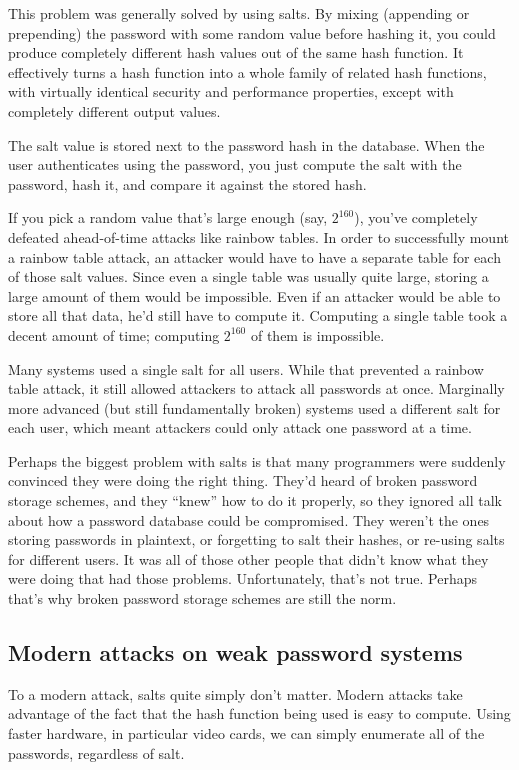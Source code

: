 \documentclass[11pt,ebook,table,dvipsnames]{memoir}
\begin{document}
This problem was generally solved by using \glspl{salt}. By mixing
(appending or prepending) the password with some random value before
hashing it, you could produce completely different hash values out of
the same hash function. It effectively turns a hash function into a
whole family of related hash functions, with virtually identical
security and performance properties, except with completely different
output values.

The salt value is stored next to the password hash in the database.
When the user authenticates using the password, you just compute the
salt with the password, hash it, and compare it against the stored
hash.

If you pick a random value that's large enough (say, $2^{160}$),
you've completely defeated ahead-of-time attacks like rainbow tables.
In order to successfully mount a rainbow table attack, an attacker
would have to have a separate table for each of those salt values.
Since even a single table was usually quite large, storing a large
amount of them would be impossible. Even if an attacker would be able
to store all that data, he'd still have to compute it. Computing a
single table took a decent amount of time; computing $2^{160}$ of them
is impossible.

Many systems used a single salt for all users. While that prevented a
rainbow table attack, it still allowed attackers to attack all
passwords at once. Marginally more advanced (but still fundamentally
broken) systems used a different salt for each user, which meant
attackers could only attack one password at a time.

Perhaps the biggest problem with salts is that many programmers were
suddenly convinced they were doing the right thing. They'd heard of
broken password storage schemes, and they \enquote{knew} how to do it
properly, so they ignored all talk about how a password database could
be compromised. They weren't the ones storing passwords in plaintext,
or forgetting to salt their hashes, or re-using salts for different
users. It was all of those other people that didn't know what they
were doing that had those problems. Unfortunately, that's not true.
Perhaps that's why broken password storage schemes are still the norm.
\subsection{Modern attacks on weak password systems}
\label{sec-2-6-7-4}

To a modern attack, salts quite simply don't matter. Modern attacks
take advantage of the fact that the hash function being used is easy
to compute. Using faster hardware, in particular video cards, we can
simply enumerate all of the passwords, regardless of salt.
\end{document}
